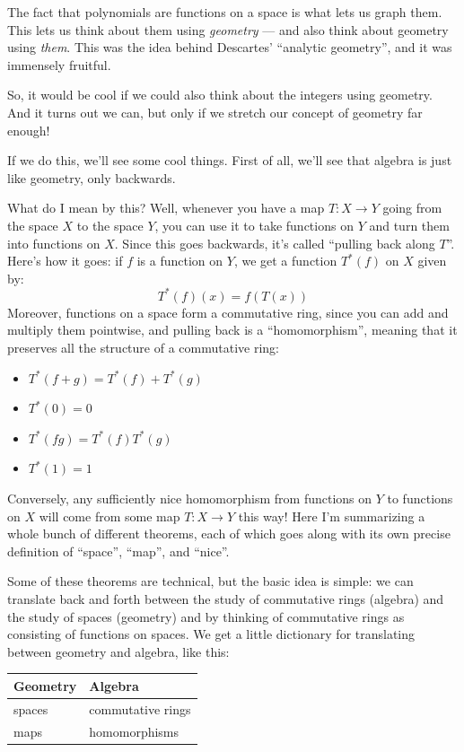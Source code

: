 \documentclass{article}
\def\tightlist{}
\begin{document}
The fact that polynomials are functions on a space is what lets us graph
them. This lets us think about them using \emph{geometry} --- and also
think about geometry using \emph{them}. This was the idea behind
Descartes' ``analytic geometry'', and it was immensely fruitful.

So, it would be cool if we could also think about the integers using
geometry. And it turns out we can, but only if we stretch our concept of
geometry far enough!

If we do this, we'll see some cool things. First of all, we'll see that
algebra is just like geometry, only backwards.

What do I mean by this? Well, whenever you have a map
\(T\colon X \to Y\) going from the space \(X\) to the space \(Y\), you
can use it to take functions on \(Y\) and turn them into functions on
\(X\). Since this goes backwards, it's called ``pulling back along
\(T\)''. Here's how it goes: if \(f\) is a function on \(Y\), we get a
function \(T^*(f)\) on \(X\) given by: \[T^*(f)(x) = f(T(x))\] Moreover,
functions on a space form a commutative ring, since you can add and
multiply them pointwise, and pulling back is a ``homomorphism'', meaning
that it preserves all the structure of a commutative ring:

\begin{itemize}
\tightlist
\item
  \(T^*(f + g) = T^*(f) + T^*(g)\)
\item
  \(T^*(0) = 0\)
\item
  \(T^*(fg) = T^*(f) T^*(g)\)
\item
  \(T^*(1) = 1\)
\end{itemize}

Conversely, any sufficiently nice homomorphism from functions on \(Y\)
to functions on \(X\) will come from some map \(T\colon X \to Y\) this
way! Here I'm summarizing a whole bunch of different theorems, each of
which goes along with its own precise definition of ``space'', ``map'',
and ``nice''.

Some of these theorems are technical, but the basic idea is simple: we
can translate back and forth between the study of commutative rings
(algebra) and the study of spaces (geometry) and by thinking of
commutative rings as consisting of functions on spaces. We get a little
dictionary for translating between geometry and algebra, like this:

\begin{longtable}[]{@{}ll@{}}
\toprule
Geometry & Algebra\tabularnewline
\midrule
\endhead
spaces & commutative rings\tabularnewline
maps & homomorphisms\tabularnewline
\bottomrule
\end{longtable}
\end{document}
